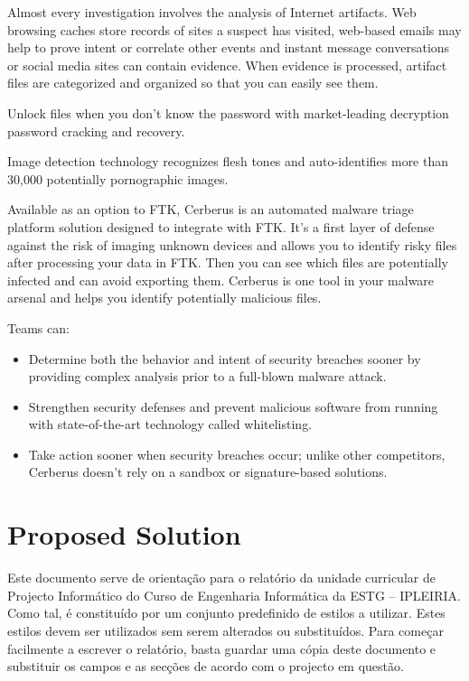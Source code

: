 Almost every investigation involves the analysis of Internet artifacts. Web browsing caches store records of sites a 
suspect has visited, web-based emails may help to prove intent or correlate other events and instant message 
conversations or social media sites can contain evidence. 
When evidence is processed, artifact files are categorized and organized so that you can easily see them. 

Unlock files when you don’t know the password with market-leading decryption password cracking and recovery. 

Image detection technology recognizes flesh tones and auto-identifies more than 30,000 potentially 
pornographic images.

Available as an option to FTK, Cerberus is an automated malware triage platform solution designed to integrate 
with FTK. It’s a first layer of defense against the risk of imaging unknown devices and allows you to identify 
risky files after processing your data in FTK. Then you can see which files are potentially infected and can avoid 
exporting them. Cerberus is one tool in your malware arsenal and helps you identify potentially malicious files.

Teams can:
\begin{itemize}
\item Determine both the behavior and intent of security 
breaches sooner by providing complex analysis prior 
to a full-blown malware attack. 
\item Strengthen security defenses and prevent malicious 
software from running with state-of-the-art technology 
called whitelisting. 
\item Take action sooner when security breaches occur; unlike 
other competitors, Cerberus doesn’t rely on a sandbox 
or signature-based solutions. 
\end{itemize}

\section{Proposed Solution}

\pagebreak

Este documento serve de orientação para o relatório da unidade curricular de Projecto Informático do Curso de Engenharia Informática da ESTG – IPLEIRIA. Como tal, é constituído por um conjunto predefinido de estilos a utilizar. Estes estilos devem ser utilizados sem serem alterados ou substituídos. Para começar facilmente a escrever o relatório, basta guardar uma cópia deste documento e substituir os campos e as secções de acordo com o projecto em questão.


